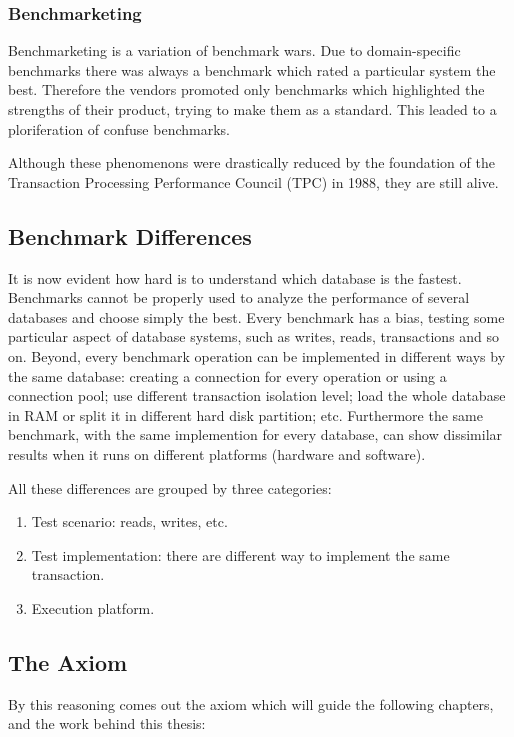 		\subsubsection{Benchmarketing}
Benchmarketing is a variation of benchmark wars. Due to domain-specific benchmarks there was always a benchmark which rated a particular system the best. Therefore the vendors promoted only benchmarks which highlighted the strengths of their product, trying to make them as a standard. This leaded to a ploriferation of confuse benchmarks.

		\vspace{0.5cm}
Although these phenomenons were drastically reduced by the foundation of the Transaction Processing Performance Council (TPC) in 1988, they are still alive.

		\subsection{Benchmark Differences} \label{categories}
It is now evident how hard is to understand which database is the fastest. Benchmarks cannot be properly used to analyze the performance of several databases and choose simply the best. Every benchmark has a bias, testing some particular aspect of database systems, such as writes, reads, transactions and so on. Beyond, every benchmark operation can be implemented in different ways by the same database: creating a connection for every operation or using a connection pool; use different transaction isolation level; load the whole database in RAM or split it in different hard disk partition; etc. Furthermore the same benchmark, with the same implemention for every database, can show dissimilar results when it runs on different platforms (hardware and software).

All these differences are grouped by three categories:
\begin{enumerate}
	\item Test scenario: reads, writes, etc.
	\item Test implementation: there are different way to implement the same transaction.
	\item Execution platform.
\end{enumerate}
	
		\subsection{The Axiom}
By this reasoning comes out the axiom which will guide the following chapters, and the work behind this thesis:

